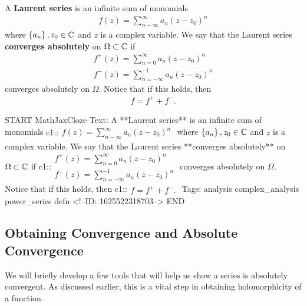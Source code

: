 \documentclass{memoir}
\begin{document}
\begin{defn}
A \textbf{Laurent series} is an infinite sum of monomials
\begin{align*}
	f(z) = \sum_{n-\infty}^{\infty} a_n (z-z_0)^{n}
\end{align*}
where \(\left\{ a_n \right\},z_0  \in \mathbb{C}\) and \(z\) is a complex variable. We say that the Laurent series \textbf{converges absolutely} on \(\Omega \subset \mathbb{C}\) if
\begin{align*}
	f^{+}(z) = \sum_{n=0}^{\infty} a_n (z-z_0)^{n}\\
	f^{-}(z) = \sum_{n=-\infty}^{-1} a_n (z-z_0)^{n}
\end{align*}
converges absolutely on \(\Omega \). Notice that if this holds, then
\begin{align*}
	f = f^{+}+ f^{-}.
\end{align*}
\end{defn}

\begin{anki}
START
MathJaxCloze
Text: A **Laurent series** is an infinite sum of monomials
 {{c1::\(\begin{align*}
         	f(z) = \sum_{n-\infty}^{\infty} a_n (z-z_0)^{n}
         \end{align*}\)}} 
where \(\left\{ a_n \right\},z_0  \in \mathbb{C}\) and \(z\) is a complex variable. We say that the Laurent series **converges absolutely** on \(\Omega \subset \mathbb{C}\) if
{{c1::\(\begin{align*}
         	f^{+}(z) = \sum_{n=0}^{\infty} a_n (z-z_0)^{n}\\
         	f^{-}(z) = \sum_{n=-\infty}^{-1} a_n (z-z_0)^{n}
         \end{align*}\)}} 
converges absolutely on \(\Omega \). Notice that if this holds, then
 {{c1::\(\begin{align*}
        	f = f^{+}+ f^{-}.
        \end{align*}\)}} 
Tags: analysis complex_analysis power_series defn
<!--ID: 1625522318703-->
END
\end{anki}


\subsection{Obtaining Convergence and Absolute Convergence}
\label{sub:obtaining_absolute_convergence}
We will briefly develop a few tools that will help us show a series is absolutely convergent. As discussed earlier, this is a vital step in obtaining holomorphicity of a function.
\end{document}
